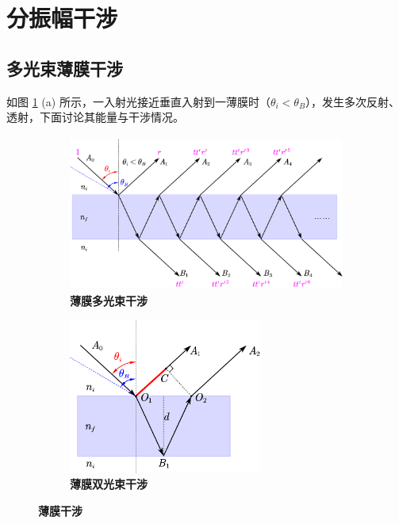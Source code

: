 \documentclass[UTF8]{report}
\theoremstyle{MyLineTheoremStyle} %
\theoremstyle{MyBlockTheoremStyle} %
\theoremstyle{MySubsubsectionStyle} %
\begin{document}
\section{分振幅干涉}

\subsection{多光束薄膜干涉}




如图 \ref{薄膜干涉} (a) 所示，一入射光接近垂直入射到一薄膜时（$\theta_i < \theta_B$），发生多次反射、透射，下面讨论其能量与干涉情况。

\begin{figure}[H]\centering
    \begin{subfigure}[t]{0.6\columnwidth}\centering
        \includegraphics[height=145pt]{assets/3/薄膜干涉.pdf}
        \caption{\bfseries 薄膜多光束干涉 }
    \end{subfigure}\hfill
    \begin{subfigure}[t]{0.4\columnwidth}\centering
        \includegraphics[height=145pt]{assets/3/薄膜双光束干涉.pdf}
        \caption{\bfseries 薄膜双光束干涉 }
    \end{subfigure}
    \caption{\bfseries 薄膜干涉 }\label{薄膜干涉}
\end{figure}
\end{document}
